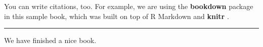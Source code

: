 \documentclass[]{book}
\begin{document}
You can write citations, too. For example, we are using the
\textbf{bookdown} package \citep{R-bookdown} in this sample book, which
was built on top of R Markdown and \textbf{knitr} \citep{xie2015}.

\begin{center}\rule{0.5\linewidth}{\linethickness}\end{center}

We have finished a nice book.


\end{document}
